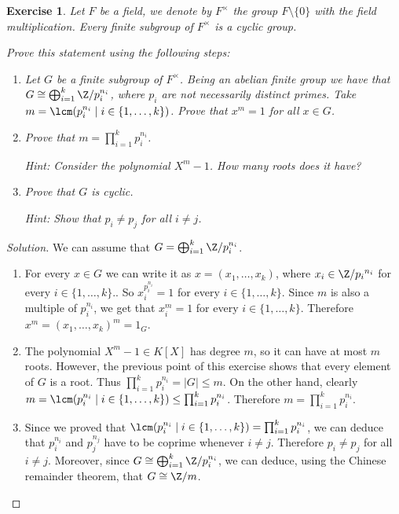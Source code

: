 \documentclass[a4paper,10pt,reqno]{amsart}
\newtheorem{ex}{Exercise}[section]
\newenvironment{sol}
  {\renewcommand\qedsymbol{$\blacksquare$}\begin{proof}[Solution]}
  {\end{proof}}
\begin{document}
\begin{ex}
\label{6.1}
    Let $F$ be a field, we denote by $F^\times$ the group $F\setminus\{0\}$ with the field multiplication. Every finite subgroup of $F^\times$ is a cyclic group.
    
    Prove this statement using the following steps:
    \begin{enumerate}[label=(\roman*)]
        \item Let $G$ be a finite subgroup of $F^\times$. Being an abelian finite group we have that $G\cong \bigoplus_{i=1}^k \Z/{p_i^{n_i}}$,
        where $p_i$ are not necessarily distinct primes.
        Take $m=\lcm(p_i^{n_i}\mid i\in\{1,\dots,k\})$.
        Prove that $x^m=1$ for all $x\in G$.
        \item Prove that $m=\prod_{i=1}^k p_i^{n_i}$.
        
        \noindent\textit{Hint: }Consider the polynomial $X^m-1$. How many roots does it have?
        \item Prove that $G$ is cyclic.
        
        \noindent\textit{Hint: }Show that $p_i\neq p_j$ for all $i\neq j$.
    \end{enumerate}
\end{ex}
\begin{sol}
We can assume that $G=\bigoplus_{i=1}^k \Z/{p_i^{n_i}}$.
\begin{enumerate}[label=(\roman*)]
    \item For every $x\in G$ we can write it as $x=(x_1,\dots, x_k)$, where $x_i\in \Z/{p_i}^{n_i}$ for every $i\in\{1,\dots,k\}$..
    So $x_i^{p_i^{n_i}}=1$ for every $i\in\{1,\dots,k\}$.
    Since $m$ is also a multiple of $p_i^{n_i}$, we get that $x_i^m=1$ for every $i\in\{1,\dots,k\}$.
    Therefore $x^m=(x_1,\dots, x_k)^m=1_G$.
    \item The polynomial $X^m-1\in K[X]$ has degree $m$, so it can have at most $m$ roots.
    However, the previous point of this exercise shows that every element of $G$ is a root.
    Thus $\prod_{i=1}^k p_i^{n_i}=|G|\leq m$.
    On the other hand, clearly $m=\lcm(p_i^{n_i}\mid i\in\{1,\dots,k\})\leq \prod_{i=1}^k p_i^{n_i}$.
    Therefore $m=\prod_{i=1}^k p_i^{n_i}$.
    \item Since we proved that $\lcm(p_i^{n_i}\mid i\in\{1,\dots,k\})=\prod_{i=1}^k p_i^{n_i}$, we can deduce that
    $p_i^{n_i}$ and $p_j^{n_j}$ have to be coprime whenever $i\neq j$.
    Therefore $p_i\neq p_j$ for all $i\neq j$.
    Moreover, since $G\cong\bigoplus_{i=1}^k \Z/{p_i^{n_i}}$, we can deduce, using the Chinese remainder theorem,
    that $G\cong\Z/m$.\qedhere
\end{enumerate}
\end{sol}
\end{document}
